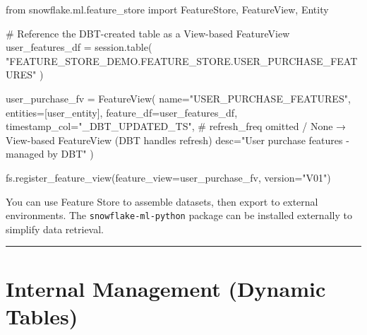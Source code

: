 \documentclass[
  letterpaper,
  DIV=11,
  numbers=noendperiod]{scrreprt}
\newenvironment{Shaded}{\begin{snugshade}}{\end{snugshade}}
\newcommand{\CommentTok}[1]{\textcolor[rgb]{0.37,0.37,0.37}{#1}}
\newcommand{\ImportTok}[1]{\textcolor[rgb]{0.00,0.46,0.62}{#1}}
\newcommand{\NormalTok}[1]{\textcolor[rgb]{0.00,0.23,0.31}{#1}}
\newcommand{\OperatorTok}[1]{\textcolor[rgb]{0.37,0.37,0.37}{#1}}
\newcommand{\StringTok}[1]{\textcolor[rgb]{0.13,0.47,0.30}{#1}}
\begin{document}
\begin{Shaded}
\begin{Highlighting}[]
\ImportTok{from}\NormalTok{ snowflake.ml.feature\_store }\ImportTok{import}\NormalTok{ FeatureStore, FeatureView, Entity}

\CommentTok{\# Reference the DBT{-}created table as a View{-}based FeatureView}
\NormalTok{user\_features\_df }\OperatorTok{=}\NormalTok{ session.table(}
    \StringTok{"FEATURE\_STORE\_DEMO.FEATURE\_STORE.USER\_PURCHASE\_FEATURES"}
\NormalTok{)}

\NormalTok{user\_purchase\_fv }\OperatorTok{=}\NormalTok{ FeatureView(}
\NormalTok{    name}\OperatorTok{=}\StringTok{"USER\_PURCHASE\_FEATURES"}\NormalTok{,}
\NormalTok{    entities}\OperatorTok{=}\NormalTok{[user\_entity],}
\NormalTok{    feature\_df}\OperatorTok{=}\NormalTok{user\_features\_df,}
\NormalTok{    timestamp\_col}\OperatorTok{=}\StringTok{"\_DBT\_UPDATED\_TS"}\NormalTok{,}
    \CommentTok{\# refresh\_freq omitted / None → View{-}based FeatureView (DBT handles refresh)}
\NormalTok{    desc}\OperatorTok{=}\StringTok{"User purchase features {-} managed by DBT"}
\NormalTok{)}

\NormalTok{fs.register\_feature\_view(feature\_view}\OperatorTok{=}\NormalTok{user\_purchase\_fv, version}\OperatorTok{=}\StringTok{"V01"}\NormalTok{)}
\end{Highlighting}
\end{Shaded}

\begin{tcolorbox}[enhanced jigsaw, title=\textcolor{quarto-callout-tip-color}{\faLightbulb}\hspace{0.5em}{Field Tip}, colbacktitle=quarto-callout-tip-color!10!white, rightrule=.15mm, arc=.35mm, colframe=quarto-callout-tip-color-frame, left=2mm, bottomtitle=1mm, toptitle=1mm, breakable, bottomrule=.15mm, opacityback=0, titlerule=0mm, toprule=.15mm, opacitybacktitle=0.6, colback=white, coltitle=black, leftrule=.75mm]

You can use Feature Store to assemble datasets, then export to external
environments. The \texttt{snowflake-ml-python} package can be installed
externally to simplify data retrieval.

\end{tcolorbox}

\begin{center}\rule{0.5\linewidth}{0.5pt}\end{center}

\hypertarget{sec-dynamic-tables}{%
\section{Internal Management (Dynamic
Tables)}\label{sec-dynamic-tables}}
\end{document}

